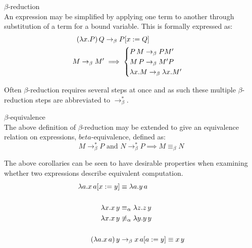     \begin{definition}{$\beta$-reduction\\}
        An expression may be simplified by applying one term to another through substitution of a term for a bound variable.
        This is formally expressed as:
        \begin{align*}
            (\lambda x . P) \, Q   & \rightarrow_\beta P[x := Q] \\
            M \rightarrow_\beta M' & \implies
                \begin{cases}
                    P \, M \rightarrow_\beta P M' \\
                    M \, P \rightarrow_\beta M' P \\
                    \lambda x . M \rightarrow_\beta \lambda x . M'
                \end{cases}
        \end{align*}
    \end{definition}
    Often $\beta$-reduction requires several steps at once and as such these multiple $\beta$-reduction steps are abbreviated to $\rightarrow_\beta^*$.

    \begin{corollary*}{$\beta$-equivalence\\}
        The above definition of $\beta$-reduction may be extended to give an equivalence relation on expressions, $beta$-equivalence, defined as:
        \begin{equation*}
            M \rightarrow_\beta^* P \text{ and } N \rightarrow_\beta^* P \implies M \equiv_\beta N
        \end{equation*}
    \end{corollary*}
    

    \begin{example*}
        The above corollaries can be seen to have desirable properties when examining whether two expressions describe equivalent computation.
        \begin{align*}
            \lambda a . x \, a [x := y] & \equiv \lambda a . y \, a \\
            \\
            \lambda x . x \, y & \equiv_\alpha \lambda z . z \, y \\
            \lambda x . x \, y & \not\equiv_\alpha \lambda y . y \, y \\
            \\
            (\lambda a . x \, a) \, y & \rightarrow_\beta x \, a [a := y] \equiv x \, y
        \end{align*}
    \end{example*}



